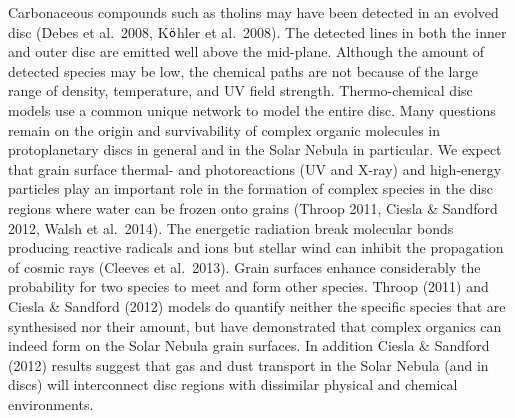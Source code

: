 \documentclass[10pt,fleqn,twoside]{article}
\begin{document}
Carbonaceous compounds such as tholins may have been detected in an evolved disc (Debes et al.\ 2008, K$\ddot{\textsf o}$hler et al.\ 2008). The detected lines in both the inner and outer disc are emitted well above the mid-plane. Although the amount of detected species may be low, the chemical paths are not because of the large range of density, temperature, and UV field strength. Thermo-chemical disc models use a common unique network to model the entire disc. Many questions remain on the origin and survivability of complex organic molecules in protoplanetary discs in general and in the Solar Nebula in particular. We expect that grain surface thermal- and photoreactions (UV and X-ray) and high-energy particles play an important role in the formation of complex species in the disc regions where water can be frozen onto grains (Throop 2011, Ciesla \& Sandford 2012, Walsh et al.\ 2014). The energetic radiation break molecular bonds producing reactive radicals and ions but stellar wind can inhibit the propagation of cosmic rays (Cleeves et al.\ 2013). Grain surfaces enhance considerably the probability for two species to meet and form other species. Throop (2011) and Ciesla \& Sandford (2012) models do quantify neither the specific species that are synthesised nor their amount, but have demonstrated that complex organics can indeed form on the Solar Nebula grain surfaces. In addition Ciesla \& Sandford (2012) results suggest that gas and dust transport in the Solar Nebula (and in discs) will interconnect disc regions with dissimilar physical and chemical environments.
\end{document}
